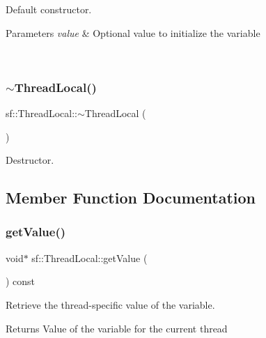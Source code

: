 Default constructor. 


\begin{DoxyParams}{Parameters}
{\em value} & Optional value to initialize the variable \begin{DoxyVerb}\end{DoxyVerb}
 \\
\hline
\end{DoxyParams}
\mbox{\label{classsf_1_1_thread_local_acc612bddfd0f0507b1c5da8b3b8c75c2}} 
\subsubsection{\texorpdfstring{$\sim$ThreadLocal()}{~ThreadLocal()}}
{\footnotesize\ttfamily sf\+::\+Thread\+Local\+::$\sim$\+Thread\+Local (\begin{DoxyParamCaption}{ }\end{DoxyParamCaption})}



Destructor. 

\begin{DoxyVerb}\end{DoxyVerb}
 

\subsection{Member Function Documentation}
\mbox{\label{classsf_1_1_thread_local_ad68823496eb065b4b695c3468fa869bc}} 
\subsubsection{\texorpdfstring{getValue()}{getValue()}}
{\footnotesize\ttfamily void$\ast$ sf\+::\+Thread\+Local\+::get\+Value (\begin{DoxyParamCaption}{ }\end{DoxyParamCaption}) const}



Retrieve the thread-\/specific value of the variable. 

\begin{DoxyReturn}{Returns}
Value of the variable for the current thread \begin{DoxyVerb}\end{DoxyVerb}
 
\end{DoxyReturn}
\mbox{\label{classsf_1_1_thread_local_ab7e334c83d77644a8e67ee31c3230007}} 
